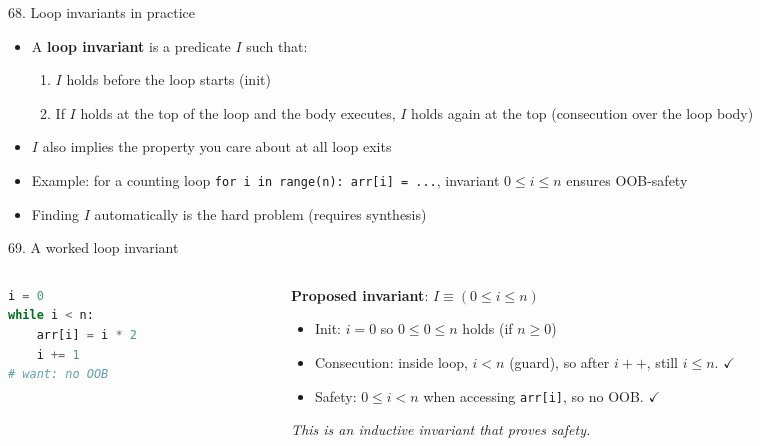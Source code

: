 \documentclass[aspectratio=169]{beamer}
\begin{document}
\begin{frame}{68. Loop invariants in practice}
\begin{itemize}
  \item A \textbf{loop invariant} is a predicate \(I\) such that:
    \begin{enumerate}
      \item \(I\) holds before the loop starts (init)
      \item If \(I\) holds at the top of the loop and the body executes, \(I\) holds again at the top (consecution over the loop body)
    \end{enumerate}
  \item \(I\) also implies the property you care about at all loop exits
  \item Example: for a counting loop \texttt{for i in range(n): arr[i] = ...}, invariant \(0 \le i \le n\) ensures OOB-safety
  \item Finding \(I\) automatically is the hard problem (requires synthesis)
\end{itemize}
\end{frame}

\begin{frame}[fragile]{69. A worked loop invariant}
\begin{columns}
\begin{column}{0.4\textwidth}
\begin{lstlisting}[language=Python]
i = 0
while i < n:
    arr[i] = i * 2
    i += 1
# want: no OOB
\end{lstlisting}
\end{column}
\begin{column}{0.55\textwidth}
\textbf{Proposed invariant}: \(I \equiv (0 \le i \le n)\)
\begin{itemize}
  \item Init: \(i=0\) so \(0 \le 0 \le n\) holds (if \(n \ge 0\))
  \item Consecution: inside loop, \(i < n\) (guard), so after \(i{+}{+}\), still \(i \le n\). \(\checkmark\)
  \item Safety: \(0 \le i < n\) when accessing \texttt{arr[i]}, so no OOB. \(\checkmark\)
\end{itemize}
\emph{This is an inductive invariant that proves safety.}
\end{column}
\end{columns}
\end{frame}
\end{document}
